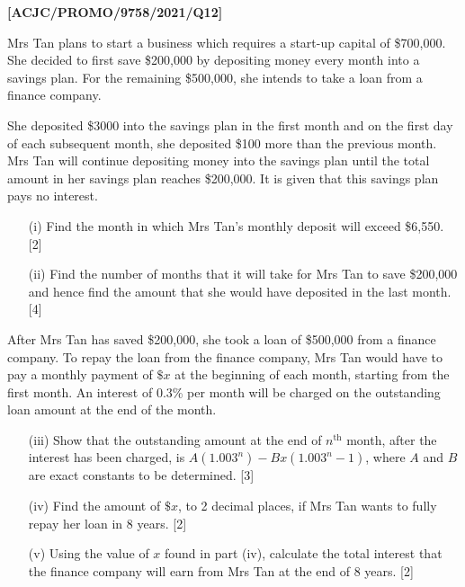 \item \textbf{{[}ACJC/PROMO/9758/2021/Q12{]}}

Mrs Tan plans to start a business which requires a start-up capital
of \$700,000. She decided to first save \$200,000 by depositing money
every month into a savings plan. For the remaining \$500,000, she
intends to take a loan from a finance company. 

She deposited \$3000 into the savings plan in the first month and
on the first day of each subsequent month, she deposited \$100 more
than the previous month. Mrs Tan will continue depositing money into
the savings plan until the total amount in her savings plan reaches
\$200,000. It is given that this savings plan pays no interest. 
\begin{enumerate}
\item[(i)]  Find the month in which Mrs Tan\textquoteright s monthly deposit
will exceed \$6,550.\hfill{} {[}2{]}
\item[(ii)]  Find the number of months that it will take for Mrs Tan to save
\$200,000 and hence find the amount that she would have deposited
in the last month.\hfill{} {[}4{]}
\end{enumerate}
After Mrs Tan has saved \$200,000, she took a loan of \$500,000 from
a finance company. To repay the loan from the finance company, Mrs
Tan would have to pay a monthly payment of $\$x$ at the beginning
of each month, starting from the first month. An interest of 0.3\%
per month will be charged on the outstanding loan amount at the end
of the month. 
\begin{enumerate}
\item[(iii)]  Show that the outstanding amount at the end of $n^{\text{th}}$
month, after the interest has been charged, is $A\left(1.003^{n}\right)-Bx\left(1.003^{n}-1\right)$,
where $A$ and $B$ are exact constants to be determined. \hfill{}{[}3{]}
\item[(iv)]  Find the amount of $\$x$, to 2 decimal places, if Mrs Tan wants
to fully repay her loan in 8 years. \hfill{}{[}2{]}
\item[(v)]  Using the value of $x$ found in part (iv), calculate the total
interest that the finance company will earn from Mrs Tan at the end
of 8 years.\hfill{} {[}2{]}
\end{enumerate}